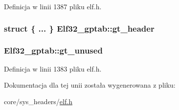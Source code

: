 Definicja w linii 1387 pliku elf.\-h.

\hypertarget{union_elf32__gptab_a441c6711b23ee48ff59b9e42287d146b}{
\subsubsection[{gt\-\_\-header}]{\setlength{\rightskip}{0pt plus 5cm}struct \{ ... \}   Elf32\-\_\-gptab\-::gt\-\_\-header}}\label{union_elf32__gptab_a441c6711b23ee48ff59b9e42287d146b}
\hypertarget{union_elf32__gptab_aefa9e4dcc4bff4e59999b01f0bc790bf}{
\subsubsection[{gt\-\_\-unused}]{ Elf32\-\_\-gptab\-::gt\-\_\-unused}}\label{union_elf32__gptab_aefa9e4dcc4bff4e59999b01f0bc790bf}


Definicja w linii 1383 pliku elf.\-h.



Dokumentacja dla tej unii została wygenerowana z pliku\-:\begin{DoxyCompactItemize}
\item 
core/sys\-\_\-headers/\hyperlink{elf_8h}{elf.\-h}\end{DoxyCompactItemize}
